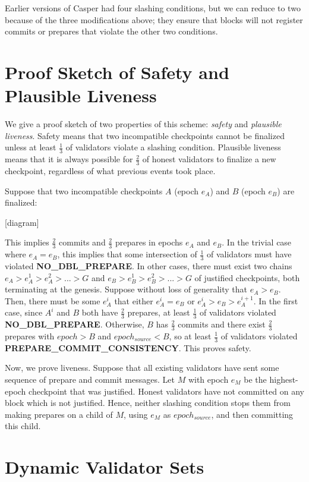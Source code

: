 \documentclass[12pt]{article}
\begin{document}
Earlier versions of Casper had four slashing conditions, but we can reduce to two because of the three modifications above; they ensure that blocks will not register commits or prepares that violate the other two conditions.

\section{Proof Sketch of Safety and Plausible Liveness}

We give a proof sketch of two properties of this scheme: \textit{safety} and \textit{plausible liveness}. Safety means that two incompatible checkpoints cannot be finalized unless at least $\frac{1}{3}$ of validators violate a slashing condition. Plausible liveness means that it is always possible for $\frac{2}{3}$ of honest validators to finalize a new checkpoint, regardless of what previous events took place.

Suppose that two incompatible checkpoints $A$ (epoch $e_A$) and $B$ (epoch $e_B$) are finalized:

[diagram]

This implies $\frac{2}{3}$ commits and $\frac{2}{3}$ prepares in epochs $e_A$ and $e_B$. In the trivial case where $e_A = e_B$, this implies that some intersection of $\frac{1}{3}$ of validators must have violated \textbf{NO\_DBL\_PREPARE}. In other cases, there must exist two chains $e_A > e_A^1 > e_A^2 > ... > G$ and $e_B > e_B^1 > e_B^2 > ... > G$ of justified checkpoints, both terminating at the genesis. Suppose without loss of generality that $e_A > e_B$. Then, there must be some $e_A^i$ that either $e_A^i = e_B$ or $e_A^i > e_B > e_A^{i+1}$. In the first case, since $A^i$ and $B$ both have $\frac{2}{3}$ prepares, at least $\frac{1}{3}$ of validators violated \textbf{NO\_DBL\_PREPARE}. Otherwise, $B$ has $\frac{2}{3}$ commits and there exist $\frac{2}{3}$ prepares with $epoch > B$ and $epoch_{source} < B$, so at least $\frac{1}{3}$ of validators violated \textbf{PREPARE\_COMMIT\_CONSISTENCY}. This proves safety.

Now, we prove liveness. Suppose that all existing validators have sent some sequence of prepare and commit messages. Let $M$ with epoch $e_M$ be the highest-epoch checkpoint that was justified. Honest validators have not committed on any block which is not justified. Hence, neither slashing condition stops them from making prepares on a child of $M$, using $e_M$ as $epoch_{source}$, and then committing this child.

\section{Dynamic Validator Sets}
\end{document}

